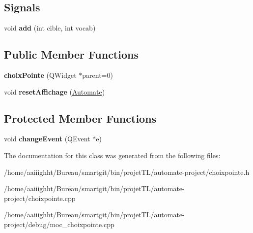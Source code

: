\subsection*{Signals}
\begin{DoxyCompactItemize}
\item 
\hypertarget{classchoix_pointe_a586763c92b709e2e5d0b27c412e62ec2}{void {\bfseries add} (int cible, int vocab)}\label{classchoix_pointe_a586763c92b709e2e5d0b27c412e62ec2}

\end{DoxyCompactItemize}
\subsection*{Public Member Functions}
\begin{DoxyCompactItemize}
\item 
\hypertarget{classchoix_pointe_adb585f204f3b658650d3a4b42d871e04}{{\bfseries choix\-Pointe} (Q\-Widget $\ast$parent=0)}\label{classchoix_pointe_adb585f204f3b658650d3a4b42d871e04}

\item 
\hypertarget{classchoix_pointe_a8c91319071281be73b5d762dfa985bbd}{void {\bfseries reset\-Affichage} (\hyperlink{class_automate}{Automate})}\label{classchoix_pointe_a8c91319071281be73b5d762dfa985bbd}

\end{DoxyCompactItemize}
\subsection*{Protected Member Functions}
\begin{DoxyCompactItemize}
\item 
\hypertarget{classchoix_pointe_a7becbc30c1a5f930c98336623595d181}{void {\bfseries change\-Event} (Q\-Event $\ast$e)}\label{classchoix_pointe_a7becbc30c1a5f930c98336623595d181}

\end{DoxyCompactItemize}


The documentation for this class was generated from the following files\-:\begin{DoxyCompactItemize}
\item 
/home/aaiiighht/\-Bureau/smartgit/bin/projet\-T\-L/automate-\/project/choixpointe.\-h\item 
/home/aaiiighht/\-Bureau/smartgit/bin/projet\-T\-L/automate-\/project/choixpointe.\-cpp\item 
/home/aaiiighht/\-Bureau/smartgit/bin/projet\-T\-L/automate-\/project/debug/moc\-\_\-choixpointe.\-cpp\end{DoxyCompactItemize}

